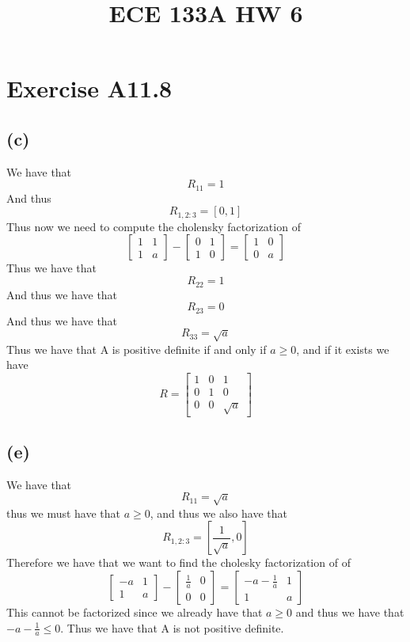 
\title{ECE 133A HW 6}

\maketitle
\section*{Exercise A11.8}
\subsection*{(c)}
We have that 
$$R_11=1$$
And thus 
$$R_{1,2:3}=[0,1]$$
Thus now we need to compute the cholensky factorization of 
$$\begin{bmatrix}
    1 & 1\\
    1 & a
\end{bmatrix}-\begin{bmatrix}
    0 & 1\\
    1 & 0
\end{bmatrix}=\begin{bmatrix}
    1 & 0\\
    0 & a
\end{bmatrix}$$
Thus we have that 
$$R_{22}=1$$
And thus we have that 
$$R_{23}=0$$
And thus we have that
$$R_{33}=\sqrt{a}$$
Thus we have that A is positive definite if and only if $a\geq0$, and if it 
exists we have
$$R=\begin{bmatrix}
    1 & 0 & 1\\
    0 & 1 & 0\\
    0 & 0 & \sqrt{a}
\end{bmatrix}$$
\subsection*{(e)}
We have that 
$$R_11=\sqrt{a}$$
thus we must have that $a\geq 0$, and thus we also have that 
$$R_{1,2:3}=[\frac{1}{\sqrt{a}},0]$$
Therefore we have that we want to find the cholesky factorization of
of 
$$\begin{bmatrix}
    -a & 1\\
    1 & a
\end{bmatrix}-\begin{bmatrix}
    \frac{1}{a} & 0\\
    0 & 0
\end{bmatrix}=\begin{bmatrix}
    -a-\frac{1}{a} & 1\\
    1 & a
\end{bmatrix}$$
This cannot be factorized since we already have 
that $a\geq 0$ and thus we have that $-a-\frac{1}{a}\leq 0$. Thus we have
that A is not positive definite.
